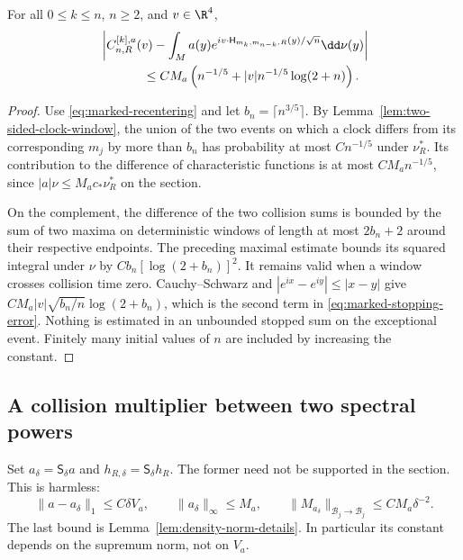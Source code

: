 \begin{proposition}
\label{prop:marked-stopping}
For all $0\le k\le n$, $n\ge2$, and $v\in\R^4$,
\begin{align}
 &\left|C^{[k],a}_{n,R}(v)
  -\int_M a(y)e^{iv\cdot\mathsf H_{m_k,m_{n-k},R}(y)/\sqrt n}\dd\nu(y)
       \right|\notag\\
 &\hspace{12mm}\le C M_a\left(n^{-1/5}
             +|v|n^{-1/5}\log(2+n)\right).
       \label{eq:marked-stopping-error}
\end{align}
\end{proposition}
\begin{proof}
Use \eqref{eq:marked-recentering} and let
$b_n=\lceil n^{3/5}\rceil$. By Lemma~\ref{lem:two-sided-clock-window},
the union of the two events on which a clock differs from its
corresponding $m_j$ by more than $b_n$ has probability at most
$Cn^{-1/5}$ under $\nu_R^*$. Its contribution to the difference of
characteristic functions is at most $C M_an^{-1/5}$, since
$|a|\nu\le M_ac_*\nu_R^*$ on the section.

On the complement, the difference of the two collision sums is bounded
by the sum of two maxima on deterministic windows of length at most
$2b_n+2$ around their respective endpoints. The preceding maximal
estimate bounds its squared integral under $\nu$ by
$C b_n[\log(2+b_n)]^2$. It remains valid when a window crosses collision
time zero. Cauchy--Schwarz and $|e^{ix}-e^{iy}|\le|x-y|$ give
$C M_a|v|\sqrt{b_n/n}\log(2+b_n)$, which is the second term in
\eqref{eq:marked-stopping-error}. Nothing is estimated in an unbounded
stopped sum on the exceptional event. Finitely many initial values of
$n$ are included by increasing the constant.
\end{proof}

\subsection{A collision multiplier between two spectral powers}
Set $a_\delta=\mathsf S_\delta a$ and $h_{R,\delta}=\mathsf S_\delta h_R$.
The former need not be supported in the section. This is harmless:
\begin{equation}\label{eq:marked-smoothing-norms}
 \|a-a_\delta\|_1\le C\delta V_a,\qquad
 \|a_\delta\|_\infty\le M_a,\qquad
 \|M_{a_\delta}\|_{\mathcal B_j\to\mathcal B_j}
       \le C M_a\delta^{-2}.
\end{equation}
The last bound is Lemma~\ref{lem:density-norm-details}. In particular
its constant depends on the supremum norm, not on $V_a$.

